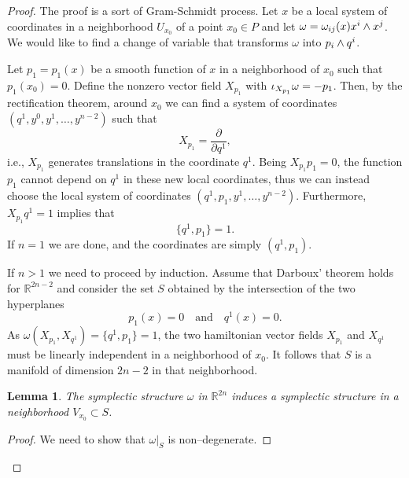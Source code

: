 \documentclass[english,fontsize=11pt,paper=a5,oneside]{scrbook}
\newcommand{\R}{\mathbb{R}}
\let\d\relax
\newcommand{\d}{\mathrm{d}}
\newtheorem{lemma}[theorem]{Lemma}
\theoremstyle{definition}
\begin{document}
\begin{proof}
  The proof is a sort of Gram-Schmidt process.
  Let $x$ be a local system of coordinates in a neighborhood $U_{x_0}$ of a point $x_0\in P$ and let $\omega = \omega_{ij}(x)\d x^i\wedge \d x^j$.
  We would like to find a change of variable that transforms $\omega$ into $\d p_i \wedge \d q^i$.

  Let $p_1=p_1(x)$ be a smooth function of $x$ in a neighborhood of $x_0$ such that $p_1(x_0) = 0$.
  Define the nonzero vector field $X_{p_1}$ with $\iota_{X_{p_1}}\omega = -\d p_1$.
  Then, by the rectification theorem, around $x_0$ we can find a system of coordinates $(q^1, y^0, y^1, \ldots, y^{n-2})$ such that
  \begin{equation}
    X_{p_1} = \frac{\partial}{\partial q^1},
  \end{equation}
  i.e., $X_{p_1}$ generates translations in the coordinate $q^1$.
  Being $X_{p_1} p_1 = 0$, the function $p_1$ cannot depend on $q^1$ in these new local coordinates, thus we can instead choose the local system of coordinates $(q^1, p_1, y^1, \ldots, y^{n-2})$.
  Furthermore, $X_{p_1} q^1 = 1$ implies that
  \begin{equation}
    \big\{q^1, p_1\big\} = 1.
  \end{equation}
  If $n=1$ we are done, and the coordinates are simply $(q^1, p_1)$.

  If $n>1$ we need to proceed by induction.
  Assume that Darboux' theorem holds for $\R^{2n-2}$ and consider the set $S$ obtained by the intersection of the two hyperplanes
  \begin{equation}
    p_1(x) = 0 \quad\mbox{and}\quad q^1(x) = 0.
  \end{equation}
  As $\omega(X_{p_1}, X_{q^1}) = \big\{q^1, p_1\big\} = 1$, the two hamiltonian vector fields $X_{p_1}$ and $X_{q^1}$ must be linearly independent in a neighborhood of $x_0$. It follows that $S$ is a manifold of dimension $2n-2$ in that neighborhood.

  \begin{lemma}
    The symplectic structure $\omega$ in $\R^{2n}$ induces a symplectic structure in a neighborhood $V_{x_0}\subset S$.
  \end{lemma}
  \begin{proof}
    We need to show that $\omega|_S$ is non--degenerate.


\end{proof}
\end{proof}
\end{document}
